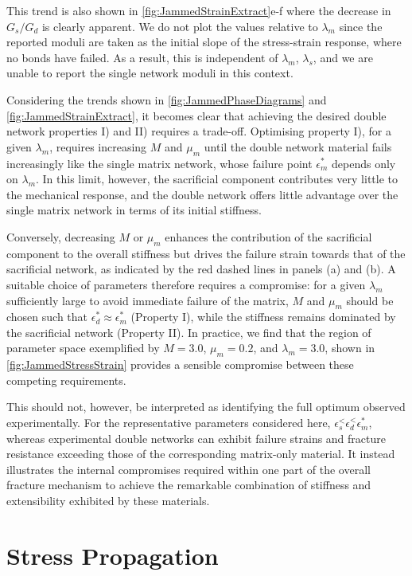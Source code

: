 This trend is also shown in \cref{fig:JammedStrainExtract}e-f where the decrease in $G_s/G_d$ is clearly apparent. We do not plot the values relative to $\lambda_m$ since the reported moduli are taken as the initial slope of the stress-strain response, where no bonds have failed. As a result, this is independent of $\lambda_m$, $\lambda_s$, and we are unable to report the single network moduli in this context. 

Considering the trends shown in \cref{fig:JammedPhaseDiagrams} and \cref{fig:JammedStrainExtract}, it becomes clear that achieving the desired double network properties I) and II) requires a trade-off. Optimising property I), for a given $\lambda_m$, requires increasing $M$ and $\mu_m$ until the double network material fails increasingly like the single matrix network, whose failure point $\epsilon_m^*$ depends only on $\lambda_m$. In this limit, however, the sacrificial component contributes very little to the mechanical response, and the double network offers little advantage over the single matrix network in terms of its initial stiffness.

Conversely, decreasing $M$ or $\mu_m$ enhances the contribution of the sacrificial component to the overall stiffness but drives the failure strain towards that of the sacrificial network, as indicated by the red dashed lines in panels (a) and (b). A suitable choice of parameters therefore requires a compromise: for a given $\lambda_m$ sufficiently large to avoid immediate failure of the matrix, $M$ and $\mu_m$ should be chosen such that $\epsilon_d^* \approx \epsilon_m^*$ (Property I), while the stiffness remains dominated by the sacrificial network (Property II). In practice, we find that the region of parameter space exemplified by $M=3.0$, $\mu_m=0.2$, and $\lambda_m=3.0$, shown in \cref{fig:JammedStressStrain} provides a sensible compromise between these competing requirements.

This should not, however, be interpreted as identifying the full optimum observed experimentally. For the representative parameters considered here, $\epsilon_s^<\epsilon_d^<\epsilon_m^*$, whereas experimental double networks can exhibit failure strains and fracture resistance exceeding those of the corresponding matrix-only material. It instead illustrates the internal compromises required within one part of the overall fracture mechanism to achieve the remarkable combination of stiffness and extensibility exhibited by these materials.

\section{Stress Propagation} \label{sec:doubleStressProp}

